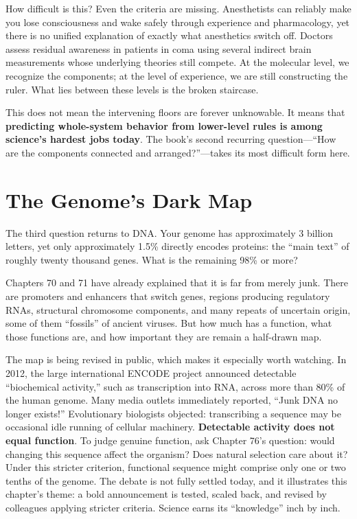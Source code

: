How difficult is this? Even the criteria are missing. Anesthetists can reliably make you lose consciousness and wake safely through experience and pharmacology, yet there is no unified explanation of exactly what anesthetics switch off. Doctors assess residual awareness in patients in coma using several indirect brain measurements whose underlying theories still compete. At the molecular level, we recognize the components; at the level of experience, we are still constructing the ruler. What lies between these levels is the broken staircase.

This does not mean the intervening floors are forever unknowable. It means that \textbf{predicting whole-system behavior from lower-level rules is among science's hardest jobs today}. The book's second recurring question---``How are the components connected and arranged?''---takes its most difficult form here.

\section{The Genome's Dark Map}

The third question returns to DNA. Your genome has approximately 3 billion letters, yet only approximately 1.5\% directly encodes proteins: the ``main text'' of roughly twenty thousand genes. What is the remaining 98\% or more?

Chapters 70 and 71 have already explained that it is far from merely junk. There are promoters and enhancers that switch genes, regions producing regulatory RNAs, structural chromosome components, and many repeats of uncertain origin, some of them ``fossils'' of ancient viruses. But how much has a function, what those functions are, and how important they are remain a half-drawn map.

The map is being revised in public, which makes it especially worth watching. In 2012, the large international ENCODE project announced detectable ``biochemical activity,'' such as transcription into RNA, across more than 80\% of the human genome. Many media outlets immediately reported, ``Junk DNA no longer exists!'' Evolutionary biologists objected: transcribing a sequence may be occasional idle running of cellular machinery. \textbf{Detectable activity does not equal function}. To judge genuine function, ask Chapter 76's question: would changing this sequence affect the organism? Does natural selection care about it? Under this stricter criterion, functional sequence might comprise only one or two tenths of the genome. The debate is not fully settled today, and it illustrates this chapter's theme: a bold announcement is tested, scaled back, and revised by colleagues applying stricter criteria. Science earns its ``knowledge'' inch by inch.

